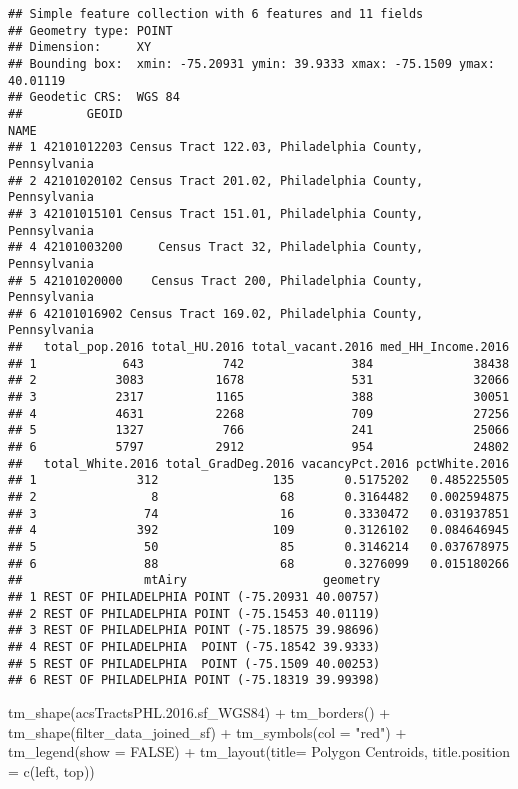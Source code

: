 \documentclass[
]{article}
\newenvironment{Shaded}{\begin{snugshade}}{\end{snugshade}}
\newcommand{\AttributeTok}[1]{\textcolor[rgb]{0.77,0.63,0.00}{#1}}
\newcommand{\ConstantTok}[1]{\textcolor[rgb]{0.00,0.00,0.00}{#1}}
\newcommand{\FloatTok}[1]{\textcolor[rgb]{0.00,0.00,0.81}{#1}}
\newcommand{\FunctionTok}[1]{\textcolor[rgb]{0.00,0.00,0.00}{#1}}
\newcommand{\NormalTok}[1]{#1}
\newcommand{\SpecialCharTok}[1]{\textcolor[rgb]{0.00,0.00,0.00}{#1}}
\newcommand{\StringTok}[1]{\textcolor[rgb]{0.31,0.60,0.02}{#1}}
\begin{document}
\begin{verbatim}
## Simple feature collection with 6 features and 11 fields
## Geometry type: POINT
## Dimension:     XY
## Bounding box:  xmin: -75.20931 ymin: 39.9333 xmax: -75.1509 ymax: 40.01119
## Geodetic CRS:  WGS 84
##         GEOID                                                   NAME
## 1 42101012203 Census Tract 122.03, Philadelphia County, Pennsylvania
## 2 42101020102 Census Tract 201.02, Philadelphia County, Pennsylvania
## 3 42101015101 Census Tract 151.01, Philadelphia County, Pennsylvania
## 4 42101003200     Census Tract 32, Philadelphia County, Pennsylvania
## 5 42101020000    Census Tract 200, Philadelphia County, Pennsylvania
## 6 42101016902 Census Tract 169.02, Philadelphia County, Pennsylvania
##   total_pop.2016 total_HU.2016 total_vacant.2016 med_HH_Income.2016
## 1            643           742               384              38438
## 2           3083          1678               531              32066
## 3           2317          1165               388              30051
## 4           4631          2268               709              27256
## 5           1327           766               241              25066
## 6           5797          2912               954              24802
##   total_White.2016 total_GradDeg.2016 vacancyPct.2016 pctWhite.2016
## 1              312                135       0.5175202   0.485225505
## 2                8                 68       0.3164482   0.002594875
## 3               74                 16       0.3330472   0.031937851
## 4              392                109       0.3126102   0.084646945
## 5               50                 85       0.3146214   0.037678975
## 6               88                 68       0.3276099   0.015180266
##                 mtAiry                   geometry
## 1 REST OF PHILADELPHIA POINT (-75.20931 40.00757)
## 2 REST OF PHILADELPHIA POINT (-75.15453 40.01119)
## 3 REST OF PHILADELPHIA POINT (-75.18575 39.98696)
## 4 REST OF PHILADELPHIA  POINT (-75.18542 39.9333)
## 5 REST OF PHILADELPHIA  POINT (-75.1509 40.00253)
## 6 REST OF PHILADELPHIA POINT (-75.18319 39.99398)
\end{verbatim}

\begin{Shaded}
\begin{Highlighting}[]
\FunctionTok{tm\_shape}\NormalTok{(acsTractsPHL.}\FloatTok{2016.}\NormalTok{sf\_WGS84) }\SpecialCharTok{+}
    \FunctionTok{tm\_borders}\NormalTok{() }\SpecialCharTok{+}
\FunctionTok{tm\_shape}\NormalTok{(filter\_data\_joined\_sf) }\SpecialCharTok{+}
    \FunctionTok{tm\_symbols}\NormalTok{(}\AttributeTok{col =} \StringTok{"red"}\NormalTok{) }\SpecialCharTok{+}
\FunctionTok{tm\_legend}\NormalTok{(}\AttributeTok{show =} \ConstantTok{FALSE}\NormalTok{) }\SpecialCharTok{+}
   \FunctionTok{tm\_layout}\NormalTok{(}\AttributeTok{title=} \StringTok{\textquotesingle{}Polygon Centroids\textquotesingle{}}\NormalTok{, }
            \AttributeTok{title.position =} \FunctionTok{c}\NormalTok{(}\StringTok{\textquotesingle{}left\textquotesingle{}}\NormalTok{, }\StringTok{\textquotesingle{}top\textquotesingle{}}\NormalTok{))}
\end{Highlighting}
\end{Shaded}
\end{document}
